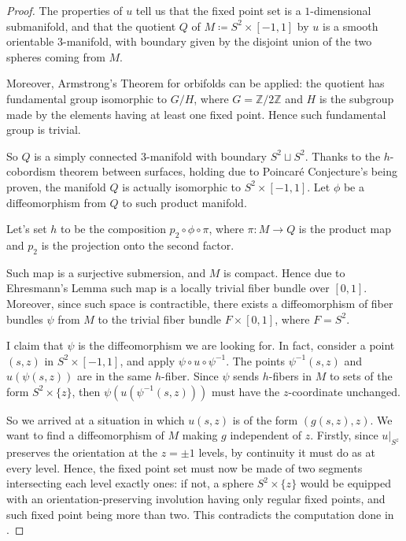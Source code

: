\documentclass[a4paper, 11pt]{amsart}
\theoremstyle{plain}
\theoremstyle{definition}
\newcommand{\Z}{\mathbb{Z}}
\begin{document}
\begin{proof}
	The properties of $u$ tell us that the fixed point set is a $1$-dimensional submanifold, and that the quotient $Q$ of $M \coloneqq S^2 \times [-1,1]$ by $u$ is a smooth orientable 3-manifold, with boundary given by the disjoint union of the two spheres coming from $M$.
	
	Moreover, Armstrong's Theorem for orbifolds \cite{ArmstrongThefundamentalgroupoftheorbitspaceofadiscontinuousgroup} can be applied: the quotient has fundamental group isomorphic to $G/H$, where $G = \Z/2\Z$ and $H$ is the subgroup made by the elements having at least one fixed point. Hence such fundamental group is trivial.
	
	So $Q$ is a simply connected 3-manifold with boundary $S^2 \sqcup S^2$. Thanks to the $h$-cobordism theorem between surfaces, holding due to Poincaré Conjecture's being proven, the manifold $Q$ is actually isomorphic to $S^2 \times [-1,1]$. Let $\phi$ be a diffeomorphism from $Q$ to such product manifold.
	
	Let's set $h$ to be the composition $p_2 \circ\phi \circ \pi$, where $\pi \colon M \to Q$ is the product map and $p_2$ is the projection onto the second factor.
	
	Such map is a surjective submersion, and $M$ is compact. Hence due to Ehresmann's Lemma \cite{EhresmannLesconnexionsininitesimales} such map is a locally trivial fiber bundle over $[0,1]$. Moreover, since such space is contractible, there exists a diffeomorphism of fiber bundles $\psi$ from $M$ to the trivial fiber bundle $F \times [0,1]$, where $F = S^2$.
	
	I claim that $\psi$ is the diffeomorphism we are looking for. In fact, consider a point $(s,z)$ in $S^2 \times [-1,1]$, and apply $\psi \circ u \circ \psi^{-1}$. The points $\psi^{-1}(s,z)$ and $u(\psi(s,z))$ are in the same $h$-fiber. Since $\psi$ sends $h$-fibers in $M$ to sets of the form $S^2 \times \{z\}$, then $\psi(u(\psi^{-1}(s,z)))$ must have the $z$-coordinate unchanged.
	
	So we arrived at a situation in which $u(s,z)$ is of the form $(g(s,z), z)$. We want to find a diffeomorphism of $M$ making $g$ independent of $z$. Firstly, since $u|_{S^z}$ preserves the orientation at the $z = \pm1$ levels, by continuity it must do as at every level. Hence, the fixed point set must now be made of two segments intersecting each level exactly ones: if not, a sphere $S^2 \times \{z\}$ would be equipped with an orientation-preserving involution having only regular fixed points, and such fixed point being more than two. This contradicts the computation done in .
	

\end{proof}
\end{document}
